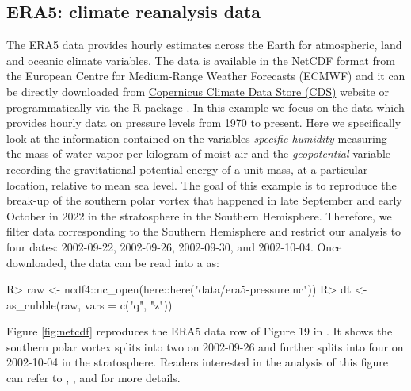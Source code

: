 \documentclass[
]{jss}
\begin{document}
\hypertarget{era5-climate-reanalysis-data}{%
\subsection{ERA5: climate reanalysis data}\label{era5-climate-reanalysis-data}}

The ERA5 data \citep{hersbach2020era5} provides hourly estimates across the Earth for atmospheric, land and oceanic climate variables. The data is available in the NetCDF format from the European Centre for Medium-Range Weather Forecasts (ECMWF) and it can be directly downloaded from \href{https://cds.climate.copernicus.eu/cdsapp\#!/dataset/reanalysis-era5-pressure-levels?tab=overview}{Copernicus Climate Data Store (CDS)} website or programmatically via the R package  \citep{ecwmfr}. In this example we focus on the  data which provides hourly data on pressure levels from 1970 to present. Here we specifically look at the information contained on the variables \emph{specific humidity} measuring the mass of water vapor per kilogram of moist air and the \emph{geopotential} variable recording the gravitational potential energy of a unit mass, at a particular location, relative to mean sea level. The goal of this example is to reproduce the break-up of the southern polar vortex that happened in late September and early October in 2022 in the stratosphere in the Southern Hemisphere. Therefore, we filter data corresponding to the Southern Hemisphere and restrict our analysis to four dates: 2002-09-22, 2002-09-26, 2002-09-30, and 2002-10-04. Once downloaded, the data can be read into a  as:

\begin{CodeChunk}
\begin{CodeInput}
R> raw <- ncdf4::nc_open(here::here("data/era5-pressure.nc"))
R> dt <- as_cubble(raw, vars = c("q", "z"))
\end{CodeInput}
\end{CodeChunk}

Figure \ref{fig:netcdf} reproduces the ERA5 data row of Figure 19 in \citet{hersbach2020era5}. It shows the southern polar vortex splits into two on 2002-09-26 and further splits into four on 2002-10-04 in the stratosphere. Readers interested in the analysis of this figure can refer to \citet{hersbach2020era5}, \citet{simmons2020global}, and \citet{simmons2005ecmwf} for more details.
\end{document}
